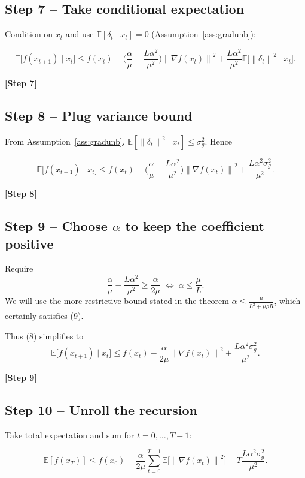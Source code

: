 \documentclass{article}
\newcommand{\E}{\mathbb{E}}
\newcommand{\norm}[1]{\left\|#1\right\|}
\newcommand{\grad}{\nabla}
\begin{document}
\subsection*{Step 7 – Take conditional expectation}
Condition on $x_{t}$ and use $\E[\delta_{t}\mid x_{t}]=0$ (Assumption~\ref{ass:gradunb}):

\[
\E\!\big[f(x_{t+1})\mid x_{t}\big]
\le f(x_{t})
-\Big(\frac{\alpha}{\mu}-\frac{L\alpha^{2}}{\mu^{2}}\Big)\norm{\grad f(x_{t})}^{2}
+\frac{L\alpha^{2}}{\mu^{2}}\E\!\big[\norm{\delta_{t}}^{2}\mid x_{t}\big].
\tag{7}
\]

\noindent\textbf{[Step 7]}

\subsection*{Step 8 – Plug variance bound}
From Assumption~\ref{ass:gradunb}, $\E[\norm{\delta_{t}}^{2}\mid x_{t}]\le\sigma_{g}^{2}$. Hence

\[
\E\!\big[f(x_{t+1})\mid x_{t}\big]
\le f(x_{t})
-\Big(\frac{\alpha}{\mu}-\frac{L\alpha^{2}}{\mu^{2}}\Big)\norm{\grad f(x_{t})}^{2}
+\frac{L\alpha^{2}\sigma_{g}^{2}}{\mu^{2}}. \tag{8}
\]

\noindent\textbf{[Step 8]}

\subsection*{Step 9 – Choose $\alpha$ to keep the coefficient positive}
Require
\[
\frac{\alpha}{\mu}-\frac{L\alpha^{2}}{\mu^{2}}\ge\frac{\alpha}{2\mu}
\;\Longleftrightarrow\;
\alpha\le\frac{\mu}{L}. \tag{9}
\]
We will use the more restrictive bound stated in the theorem
$\alpha\le\frac{\mu}{L^{2}+ \mu\rho R}$, which certainly satisfies (9).

Thus (8) simplifies to
\[
\E\!\big[f(x_{t+1})\mid x_{t}\big]
\le f(x_{t})
-\frac{\alpha}{2\mu}\norm{\grad f(x_{t})}^{2}
+\frac{L\alpha^{2}\sigma_{g}^{2}}{\mu^{2}}. \tag{10}
\]

\noindent\textbf{[Step 9]}

\subsection*{Step 10 – Unroll the recursion}
Take total expectation and sum for $t=0,\dots,T-1$:

\[
\E[f(x_{T})]
\le f(x_{0})
-\frac{\alpha}{2\mu}\sum_{t=0}^{T-1}\E\!\big[\norm{\grad f(x_{t})}^{2}\big]
+T\frac{L\alpha^{2}\sigma_{g}^{2}}{\mu^{2}}. \tag{11}
\]
\end{document}
